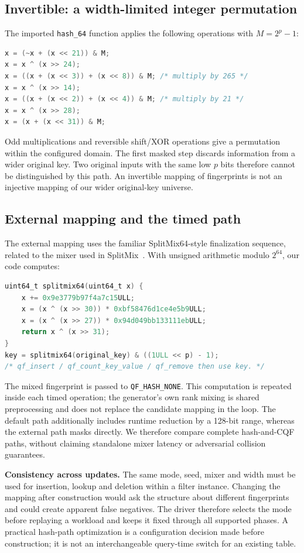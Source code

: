 \subsection{Invertible: a width-limited integer permutation}
The imported \texttt{hash\_64} function applies the following operations with $M=2^p-1$:
\begin{lstlisting}[language=C]
x = (~x + (x << 21)) & M;
x = x ^ (x >> 24);
x = ((x + (x << 3)) + (x << 8)) & M; /* multiply by 265 */
x = x ^ (x >> 14);
x = ((x + (x << 2)) + (x << 4)) & M; /* multiply by 21 */
x = x ^ (x >> 28);
x = (x + (x << 31)) & M;
\end{lstlisting}
Odd multiplications and reversible shift/XOR operations give a permutation within the configured domain. The first masked step discards information from a wider original key. Two original inputs with the same low $p$ bits therefore cannot be distinguished by this path. An invertible mapping of fingerprints is not an injective mapping of our wider original-key universe.

\subsection{External mapping and the timed path}
The external mapping uses the familiar SplitMix64-style finalization sequence, related to the mixer used in SplitMix~\cite{steele2014}. With unsigned arithmetic modulo $2^{64}$, our code computes:
\begin{lstlisting}[language=C,caption={External mapping used by the driver. This is a deterministic non-cryptographic mixer, not a new algorithm.},label={lst:splitmix}]
uint64_t splitmix64(uint64_t x) {
    x += 0x9e3779b97f4a7c15ULL;
    x = (x ^ (x >> 30)) * 0xbf58476d1ce4e5b9ULL;
    x = (x ^ (x >> 27)) * 0x94d049bb133111ebULL;
    return x ^ (x >> 31);
}
key = splitmix64(original_key) & ((1ULL << p) - 1);
/* qf_insert / qf_count_key_value / qf_remove then use key. */
\end{lstlisting}
The mixed fingerprint is passed to \texttt{QF\_HASH\_NONE}. This computation is repeated inside each timed operation; the generator's own rank mixing is shared preprocessing and does not replace the candidate mapping in the loop. The default path additionally includes runtime reduction by a 128-bit range, whereas the external path masks directly. We therefore compare complete hash-and-CQF paths, without claiming standalone mixer latency or adversarial collision guarantees.

\textbf{Consistency across updates.} The same mode, seed, mixer and width must be used for insertion, lookup and deletion within a filter instance. Changing the mapping after construction would ask the structure about different fingerprints and could create apparent false negatives. The driver therefore selects the mode before replaying a workload and keeps it fixed through all supported phases. A practical hash-path optimization is a configuration decision made before construction; it is not an interchangeable query-time switch for an existing table.
